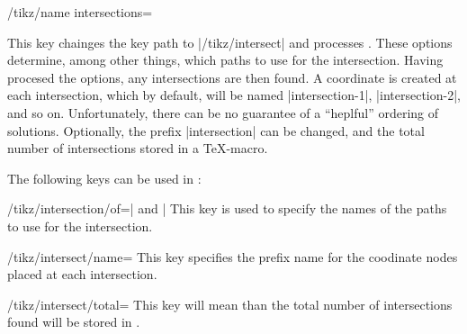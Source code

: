 \begin{key}{/tikz/name intersections=}
  
  This key chainges the key path to |/tikz/intersect| and processes
  . These options determine, among other things,
  which paths to use for the intersection. Having procesed the 
  options, any intersections are then found. A coordinate is created 
  at each intersection, which by default, will be named 
  |intersection-1|, |intersection-2|, and so on. Unfortunately, there
  can be no guarantee of a ``heplful'' ordering of solutions.
  Optionally, the prefix |intersection| can be changed, and the 
  total number of intersections stored in a \TeX-macro. 

\begin{codeexample}[]
\end{codeexample}

\end{key}

  The following keys can be used in :
  
\begin{key}{/tikz/intersection/of=| and |}
  This key is used to specify the names of the paths to use for
  the intersection.
\end{key}

\begin{key}{/tikz/intersect/name=}
  This key specifies the prefix name for the coodinate nodes placed
  at each intersection.
\end{key}

\begin{key}{/tikz/intersect/total=}
  This key will mean than the total number of intersections found
  will be stored in .
\end{key}

\begin{codeexample}[]
\end{codeexample}

